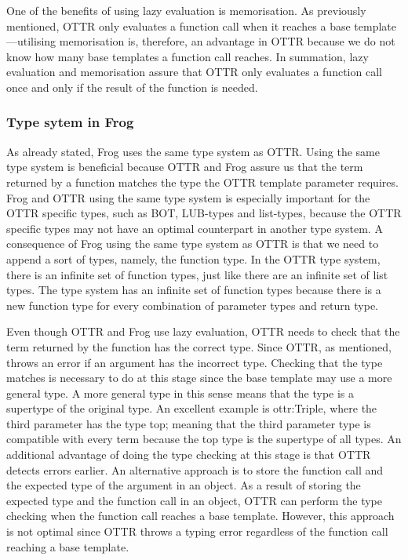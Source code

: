 \para
One of the benefits of using lazy evaluation is memorisation. As previously mentioned, OTTR only evaluates a function call when it reaches a base template—utilising memorisation is, therefore, an advantage in OTTR because we do not know how many base templates a function call reaches. In summation, lazy evaluation and memorisation assure that OTTR only evaluates a function call once and only if the result of the function is needed.

\subsubsection{Type sytem in Frog}
\label{types in frog}
As already stated, Frog uses the same type system as OTTR. Using the same type system is beneficial because OTTR and Frog assure us that the term returned by a function matches the type the OTTR template parameter requires. Frog and OTTR using the same type system is especially important for the OTTR specific types, such as BOT, LUB-types and list-types, because the OTTR specific types may not have an optimal counterpart in another type system. A consequence of Frog using the same type system as OTTR is that we need to append a sort of types, namely, the function type.  In the OTTR type system, there is an infinite set of function types, just like there are an infinite set of list types. The type system has an infinite set of function types because there is a new function type for every combination of parameter types and return type. 

\para
Even though OTTR and Frog use lazy evaluation, OTTR needs to check that the term returned by the function has the correct type. Since OTTR, as mentioned, throws an error if an argument has the incorrect type. Checking that the type matches is necessary to do at this stage since the base template may use a more general type. A more general type in this sense means that the type is a supertype of the original type. An excellent example is ottr:Triple, where the third parameter has the type top; meaning that the third parameter type is compatible with every term because the top type is the supertype of all types. An additional advantage of doing the type checking at this stage is that OTTR detects errors earlier. An alternative approach is to store the function call and the expected type of the argument in an object. As a result of storing the expected type and the function call in an object, OTTR can perform the type checking when the function call reaches a base template. However, this approach is not optimal since OTTR throws a typing error regardless of the function call reaching a base template. 

